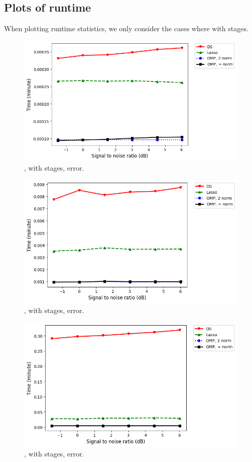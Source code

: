 \subsection {Plots of runtime}

When plotting runtime statistics, we only consider the cases where  with  stages.
%
\begin {figure} [H]
\includegraphics [width = 0.8 \textwidth] {time-small-more-square-six-usual.png}
\caption {, with  stages, error.}
\end {figure}
%
\begin {figure} [H]
\includegraphics [width = 0.8 \textwidth] {time-medium-more-square-six-usual.png}
\caption {, with  stages, error.}
\end {figure}
%
\begin {figure} [H]
\includegraphics [width = 0.8 \textwidth] {time-big-more-square-six-usual.png}
\caption {, with  stages, error.}
\end {figure}


